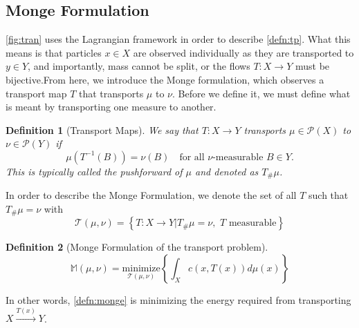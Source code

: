 \documentclass[12pt]{article}
\theoremstyle{plain}
\newtheorem{defn}{Definition}[section]
\numberwithin{equation}{section}
\begin{document}
\subsection{Monge Formulation}
\autoref{fig:tran} uses the Lagrangian framework in order to describe \autoref{defn:tp}. What this means is that particles $x\in X$ are observed individually as they are transported to $y\in Y$, and importantly, mass cannot be split, or the flows $T: X\to Y$ must be bijective.\newline From here, we introduce
the Monge formulation, which observes a transport map $T$ that transports $\mu$ to $\nu$. Before we define it, we must define what is meant by transporting one measure to another.
\begin{defn}[Transport Maps]\label{defn:transport_map}
  We say that $T: X\to Y$ transports $\mu\in \mathcal{P}(X)$ to $\nu\in\mathcal{P}(Y)$ if 
  \begin{equation*}\label{eqn:pushforward}
    \mu(T^{-1}(B)) = \nu(B) \quad\text{for all $\nu$-measurable $B\in Y$.}
  \end{equation*}
  This is typically called the \textit{pushforward} of $\mu$ and denoted as $T_\#\mu$.
\end{defn} 
In order to describe the Monge Formulation, we denote the set of all $T$ such that $T_\#\mu=\nu$ with
\begin{equation}
  \mathcal{T}(\mu,\nu) = \left\{T: X\to Y \vert T_\#\mu = \nu,\,\,\text{$T$ measurable} \right\}
\end{equation}
\begin{defn}[Monge Formulation of the transport problem]\label{defn:monge}
  \begin{equation}
    \mathbb{M}(\mu,\nu) = \underset{\mathcal{T}(\mu,\nu)}{\text{minimize}}\left\{\int_X c(x,T(x))d\mu(x)\right\}
  \end{equation}
\end{defn}
In other words, \autoref{defn:monge} is minimizing the energy required from transporting $X\overset{T(x)}{\to}Y$. 
\end{document}
